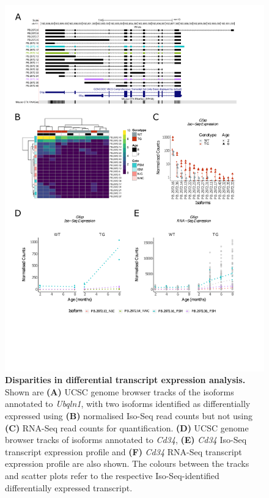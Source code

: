 \begin{figure}[!htp]
	\centering
	\includegraphics[page=3,trim={1.5cm 3cm 2cm 1cm}, scale = 0.80]{Figures/Ch5_DiffPlots.pdf}
	\captionsetup{width=0.95\textwidth}
	\caption[Disparities in differential transcript expression analysis]%
	{\textbf{Disparities in differential transcript expression analysis.} Shown are \textbf{(A)} UCSC genome browser tracks of the isoforms annotated to \textit{Ubqln1}, with two isoforms identified as differentially expressed using \textbf{(B)} normalised Iso-Seq read counts but not using \textbf{(C)} RNA-Seq read counts for quantification. \textbf{(D)} UCSC genome browser tracks of isoforms annotated to \textit{Cd34}, \textbf{(E)} \textit{Cd34} Iso-Seq transcript expression profile and \textbf{(F)} \textit{Cd34} RNA-Seq transcript expression profile are also shown. The colours between the tracks and scatter plots refer to the respective Iso-Seq-identified differentially expressed transcript.
	}   
	\label{fig:DEI_cd34_ubq}
\end{figure}


